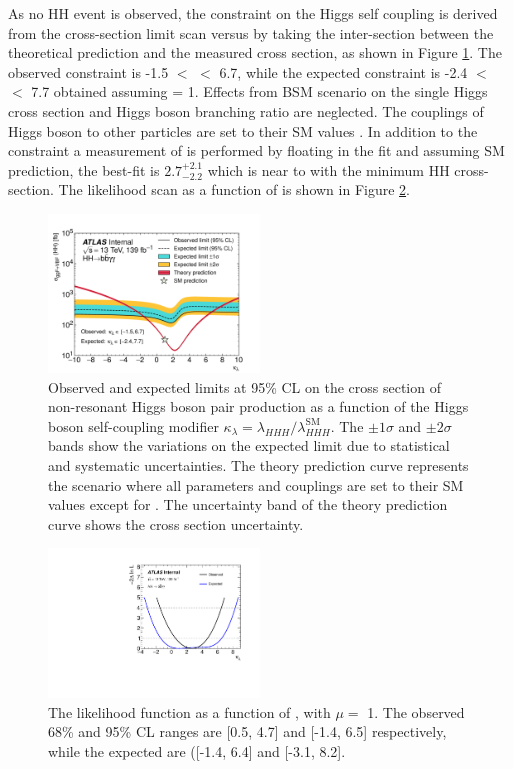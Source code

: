 As no HH event is observed, the constraint on the Higgs self coupling is derived from the cross-section limit scan versus \kl by taking the inter-section between the theoretical prediction and the measured cross section, as shown in Figure \ref{fig:HHyybb:Results:Xsec:Limit}. The observed constraint is -1.5 $<$ \kl $<$ 6.7, while the expected constraint is -2.4 $<$ \kl $<$ 7.7 obtained assuming \kl = 1. Effects from BSM scenario on the single Higgs cross section and Higgs boson branching ratio are neglected. The couplings of Higgs boson to other particles are set to their SM values \cite{Higgs_80ifb}. In addition to the constraint a measurement of \kl is performed by floating \kl in the fit and assuming SM prediction, the best-fit \kl is $2.7^{+2.1}_{-2.2}$ which is near to \kl with the minimum HH cross-section. The likelihood scan as a function of \kl is shown in Figure \ref{fig:HHyybb:Results:Xsec:LH}.
\begin{figure}[ht]
    \centering
    \includegraphics[width=0.5\textwidth]{Ch5/Img/figures_Results_kappa_lambda_scan.pdf}
    \caption{Observed and expected limits at 95\% CL on the cross section of non-resonant Higgs boson pair production as a function of the Higgs boson self-coupling modifier $\kappa_{\lambda}= \lambda_{HHH}/\lambda^{\textrm{SM}}_{HHH}$. The $\pm 1\sigma$ and $\pm 2\sigma$ bands show the variations on the expected limit due to statistical and systematic uncertainties. The theory prediction curve represents the scenario where all parameters and couplings are set to their SM values except for \kl. The uncertainty band of the theory prediction curve shows the cross section uncertainty.}
    \label{fig:HHyybb:Results:Xsec:Limit}
\end{figure}

\begin{figure}[ht]
    \centering
    \includegraphics[width=0.5\textwidth]{Ch5/Img/figures_Results_scan_hhyybb_kl.pdf}
    \caption{The likelihood function as a function of \kl, with $\mu = $  1. The observed 68\% and 95\% CL ranges are [0.5, 4.7] and [-1.4, 6.5] respectively, while the expected are ([-1.4, 6.4] and [-3.1, 8.2].}
    \label{fig:HHyybb:Results:Xsec:LH}
\end{figure}

